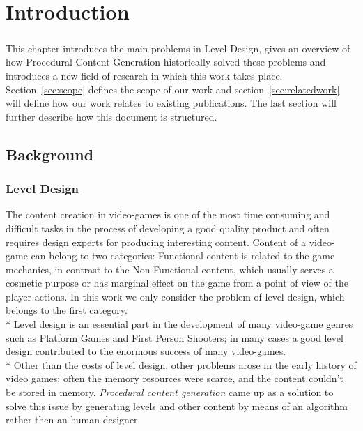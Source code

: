 \chapter{Introduction}
\paragraph{} This chapter introduces the main problems in Level Design, gives an overview of how Procedural Content Generation historically solved these problems and introduces a new field of research in which this work takes place. Section~\ref{sec:scope} defines the scope of our work and section~\ref{sec:relatedwork} will define how our work relates to existing publications. The last section will further describe how this document is structured.

\section{Background}
\subsection{Level Design}
The content creation in video-games is one of the most time consuming and difficult tasks in the process of developing a good quality product and often requires design experts for producing interesting content. Content of a video-game can belong to two categories: Functional content is related to the game mechanics, in contrast to the Non-Functional content, which usually serves a cosmetic purpose or has marginal effect on the game from a point of view of the player actions. In this work we only consider the problem of level design, which belongs to the first category. \\*
Level design is an essential part in the development of many video-game genres such as Platform Games and First Person Shooters; in many cases a good level design contributed to the enormous success of many video-games. \\*
Other than the costs of level design, other problems arose in the early history of video games: often the memory resources were scarce, and the content couldn't be stored in memory. \textit{Procedural content generation} came up as a solution to solve this issue by generating levels and other content by means of an algorithm rather then an human designer.

